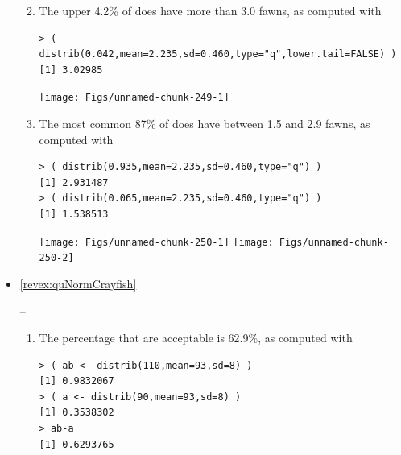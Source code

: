 \documentclass[10pt,openany]{book}\usepackage[]{graphicx}\usepackage[]{color}
\makeatletter
\newenvironment{kframe}{%
 \def\at@end@of@kframe{}%
 \ifinner\ifhmode%
  \def\at@end@of@kframe{\end{minipage}}%
  \begin{minipage}{\columnwidth}%
 \fi\fi%
 \def\FrameCommand##1{\hskip\@totalleftmargin \hskip-\fboxsep
 \colorbox{shadecolor}{##1}\hskip-\fboxsep
     \hskip-\linewidth \hskip-\@totalleftmargin \hskip\columnwidth}%
 \MakeFramed {\advance\hsize-\width
   \@totalleftmargin\z@ \linewidth\hsize
   \@setminipage}}%
 {\par\unskip\endMakeFramed%
 \at@end@of@kframe}
\newenvironment{knitrout}{}{} %
\makeatother
\begin{document}
\begin{itemize}
\begin{enumerate}
\begin{knitrout}
\end{knitrout}
      \item The upper 4.2\% of does have more than 3.0 fawns, as computed with
\begin{knitrout}
\color{fgcolor}\begin{kframe}
\begin{verbatim}
> ( distrib(0.042,mean=2.235,sd=0.460,type="q",lower.tail=FALSE) )
[1] 3.02985
\end{verbatim}
\end{kframe}

{\centering \texttt{[image: Figs/unnamed-chunk-249-1]} 

}



\end{knitrout}
      \item The most common 87\% of does have between 1.5 and 2.9 fawns, as computed with
\begin{knitrout}
\color{fgcolor}\begin{kframe}
\begin{verbatim}
> ( distrib(0.935,mean=2.235,sd=0.460,type="q") )
[1] 2.931487
> ( distrib(0.065,mean=2.235,sd=0.460,type="q") )
[1] 1.538513
\end{verbatim}
\end{kframe}

{\centering \texttt{[image: Figs/unnamed-chunk-250-1]} 
\texttt{[image: Figs/unnamed-chunk-250-2]} 

}



\end{knitrout}
    \end{enumerate}

  \item \hypertarget{ans:quNormCrayfish}{\ref{revex:quNormCrayfish}} --
    \begin{enumerate}
      \item The percentage that are acceptable is 62.9\%, as computed with
\begin{knitrout}
\color{fgcolor}\begin{kframe}
\begin{verbatim}
> ( ab <- distrib(110,mean=93,sd=8) )
[1] 0.9832067
> ( a <- distrib(90,mean=93,sd=8) )
[1] 0.3538302
> ab-a
[1] 0.6293765
\end{verbatim}
\end{kframe}


\end{knitrout}
\end{enumerate}
\end{itemize}
\end{document}
